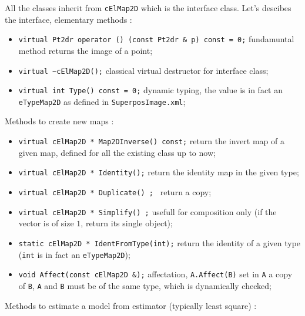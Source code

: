 All the  \CPP classes inherit from {\tt cElMap2D} which is the interface
class. Let's descibes the interface, elementary methods :

\begin{itemize}
    \item {\tt virtual Pt2dr operator () (const Pt2dr \& p) const = 0;} 
           fundamuntal method returns the image of a point;
    \item {\tt  virtual \~{}cElMap2D();} classical virtual destructor for interface class;
    \item {\tt virtual int Type() const = 0;} dynamic typing, the value is in fact 
          an {\tt eTypeMap2D} as defined in {\tt SuperposImage.xml};
\end{itemize}

Methods to create new maps :

\begin{itemize}
    \item {\tt virtual cElMap2D * Map2DInverse() const;} return the invert map of a given map,
           defined for all the existing class up to now;
    \item {\tt  virtual cElMap2D * Identity();} return the identity  map in the given type;

    \item {\tt     virtual cElMap2D * Duplicate() ; } return a copy;

    \item {\tt    virtual cElMap2D * Simplify() ;} usefull for composition only 
          (if the vector is of size $1$, return its single object);
    \item {\tt static cElMap2D * IdentFromType(int);} return the identity of a given type 
          ({\tt int} is in fact an {\tt eTypeMap2D});
    \item {\tt  void Affect(const cElMap2D \&);} affectation, {\tt A.Affect(B)} set in
          {\tt A} a copy of {\tt B}, {\tt A} and {\tt B} must be of the same type, which
          is dynamically checked;
\end{itemize}

Methods to estimate a model from estimator (typically least square) :

